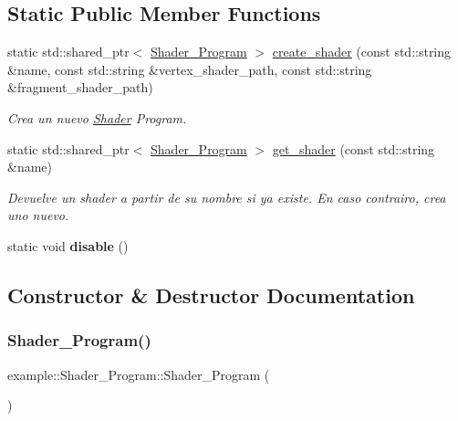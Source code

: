 \subsection*{Static Public Member Functions}
\begin{DoxyCompactItemize}
\item 
static std\+::shared\+\_\+ptr$<$ \mbox{\hyperlink{classexample_1_1_shader___program}{Shader\+\_\+\+Program}} $>$ \mbox{\hyperlink{classexample_1_1_shader___program_ac15e932e1dd47497720722af3e43ce75}{create\+\_\+shader}} (const std\+::string \&name, const std\+::string \&vertex\+\_\+shader\+\_\+path, const std\+::string \&fragment\+\_\+shader\+\_\+path)
\begin{DoxyCompactList}\small\item\em Crea un nuevo \mbox{\hyperlink{classexample_1_1_shader}{Shader}} Program. \end{DoxyCompactList}\item 
static std\+::shared\+\_\+ptr$<$ \mbox{\hyperlink{classexample_1_1_shader___program}{Shader\+\_\+\+Program}} $>$ \mbox{\hyperlink{classexample_1_1_shader___program_a96511d5af161c7e28137357ffb3d878d}{get\+\_\+shader}} (const std\+::string \&name)
\begin{DoxyCompactList}\small\item\em Devuelve un shader a partir de su nombre si ya existe. En caso contrairo, crea uno nuevo. \end{DoxyCompactList}\item 
\mbox{\label{classexample_1_1_shader___program_a1fe0129a78e4bf33fd07de4448e3657b}} 
static void {\bfseries disable} ()
\end{DoxyCompactItemize}


\subsection{Constructor \& Destructor Documentation}
\mbox{\label{classexample_1_1_shader___program_aa76001651ab84fda3d899a2b57f2a4b3}} 
\subsubsection{\texorpdfstring{Shader\_Program()}{Shader\_Program()}\hspace{0.1cm}{\footnotesize\ttfamily [1/2]}}
{\footnotesize\ttfamily example\+::\+Shader\+\_\+\+Program\+::\+Shader\+\_\+\+Program (\begin{DoxyParamCaption}{ }\end{DoxyParamCaption})\hspace{0.3cm}{\ttfamily [inline]}}



